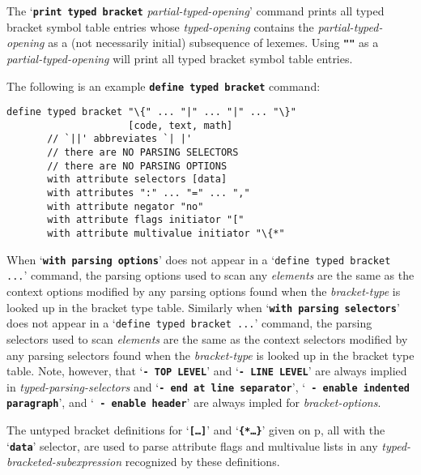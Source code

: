 \documentclass[12pt]{article}
\newcommand{\TT}[1]{{\tt \bfseries #1}}
\newcommand{\pagref}[1]{p\pageref{#1}}
\newenvironment{indpar}[1][0.3in]%
	{\begin{list}{}%
		     {\setlength{\itemsep}{0in}%
		      \setlength{\topsep}{0in}%
		      \setlength{\parsep}{1ex}%
		      \setlength{\labelwidth}{#1}%
		      \setlength{\leftmargin}{#1}%
		      \addtolength{\leftmargin}{\labelsep}}%
	 \item}%
	{\end{list}}
\begin{document}
The `\TT{print typed bracket} {\em partial-typed-opening}' command
prints all typed bracket symbol table entries whose
{\em typed-opening} contains the {\em partial-typed-opening}
as a (not necessarily initial) subsequence of lexemes.  Using \TT{""} as
a {\em partial-typed-opening} will print all typed bracket
symbol table entries.

The following is an example \TT{define typed bracket} command:
\begin{indpar}\begin{verbatim}
define typed bracket "\{" ... "|" ... "|" ... "\}"
                     [code, text, math]
       // `||' abbreviates `| |'
       // there are NO PARSING SELECTORS
       // there are NO PARSING OPTIONS
       with attribute selectors [data]
       with attributes ":" ... "=" ... ","
       with attribute negator "no"
       with attribute flags initiator "["
       with attribute multivalue initiator "\{*"
\end{verbatim}\end{indpar}

When `\TT{with parsing options}'
does not appear in a `{\tt define typed bracket ...}' command,
the parsing options used
to scan any {\em elements} are the same as the context options
modified by any parsing options
found when the {\em bracket-type} is looked up in the
bracket type table.
Similarly when
`\TT{with parsing selectors}' does not appear in a
`{\tt define typed bracket ...}' command,
the parsing selectors used to scan {\em elements}
are the same as the context selectors
modified by any parsing selectors
found when the {\em bracket-type} is looked up in the
bracket type table.
Note, however, that `\TT{- TOP LEVEL}' and `\TT{- LINE LEVEL}' are always
implied in {\em typed-parsing-selectors} and
`\TT{- end at line separator}',
`\TT{ - enable indented paragraph}', and
`\TT{ - enable header}' are always impled for
{\em bracket-options}.

The untyped bracket definitions for `\TT{[\ldots]}' and
`\TT{\{*\ldots*\}}' given on \pagref{UNTYPED-BRACKET-BUILTINS},
all with the `\TT{data}' selector, are used to parse
attribute flags and multivalue lists in any
{\em typed-bracketed-subexpression} recognized by these definitions.
\end{document}
